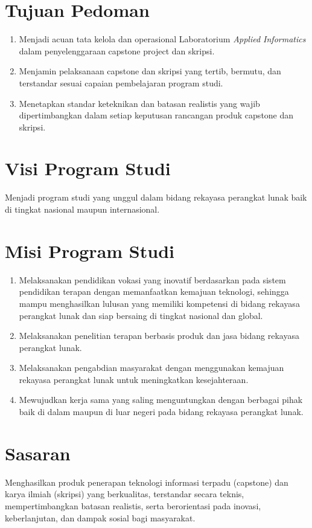 \documentclass[12pt,a4paper]{report}
\begin{document}
\section{Tujuan Pedoman}
\begin{enumerate}
\item Menjadi acuan tata kelola dan operasional Laboratorium \emph{Applied Informatics} dalam penyelenggaraan capstone project dan skripsi.
\item Menjamin pelaksanaan capstone dan skripsi yang tertib, bermutu, dan terstandar sesuai capaian pembelajaran program studi.
\item Menetapkan standar keteknikan dan batasan realistis yang wajib dipertimbangkan dalam setiap keputusan rancangan produk capstone dan skripsi.
\end{enumerate}

\section{Visi Program Studi}
Menjadi program studi yang unggul dalam bidang rekayasa perangkat lunak baik di tingkat nasional maupun internasional.

\section{Misi Program Studi}
\begin{enumerate}
\item Melaksanakan pendidikan vokasi yang inovatif berdasarkan pada sistem pendidikan terapan dengan memanfaatkan kemajuan teknologi, sehingga mampu menghasilkan lulusan yang memiliki kompetensi di bidang re\-ka\-ya\-sa pe\-rang\-kat lu\-nak dan siap bersaing di tingkat nasional dan global.
\item Melaksanakan penelitian terapan berbasis produk dan jasa bidang rekayasa perangkat lunak.
\item Melaksanakan pengabdian masyarakat dengan menggunakan kemajuan rekayasa perangkat lunak untuk meningkatkan kesejahteraan.
\item Mewujudkan kerja sama yang saling menguntungkan dengan berbagai pihak baik di dalam maupun di luar negeri pada bidang rekayasa perangkat lunak.
\end{enumerate}

\section{Sasaran}
Menghasilkan produk penerapan teknologi informasi terpadu (capstone) dan karya ilmiah (skripsi) yang berkualitas, terstandar secara teknis, mempertimbangkan batasan realistis, serta berorientasi pada inovasi, keberlanjutan, dan dampak sosial bagi masyarakat.
\end{document}
